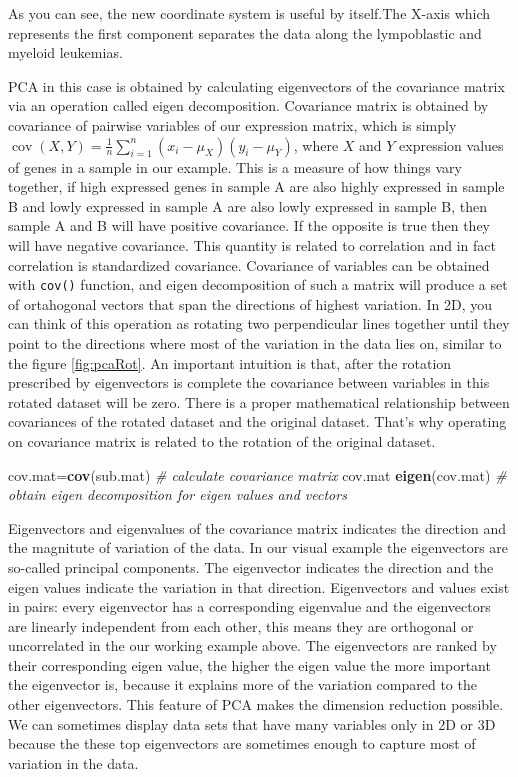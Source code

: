 \documentclass[12pt,]{krantz}
\newenvironment{Shaded}{\begin{snugshade}}{\end{snugshade}}
\newcommand{\CommentTok}[1]{\textcolor[rgb]{0.56,0.35,0.01}{\textit{#1}}}
\newcommand{\KeywordTok}[1]{\textcolor[rgb]{0.13,0.29,0.53}{\textbf{#1}}}
\newcommand{\NormalTok}[1]{#1}
\theoremstyle{definition}
\theoremstyle{definition}
\theoremstyle{definition}
\theoremstyle{remark}
\begin{document}
As you can see, the new coordinate system is useful by itself.The X-axis
which represents the first component separates the data along the
lympoblastic and myeloid leukemias.

PCA in this case is obtained by calculating eigenvectors of the
covariance matrix via an operation called eigen decomposition.
Covariance matrix is obtained by covariance of pairwise variables of our
expression matrix, which is simply
\({ \operatorname{cov} (X,Y)={\frac {1}{n}}\sum _{i=1}^{n}(x_{i}-\mu_X)(y_{i}-\mu_Y)}\),
where \(X\) and \(Y\) expression values of genes in a sample in our
example. This is a measure of how things vary together, if high
expressed genes in sample A are also highly expressed in sample B and
lowly expressed in sample A are also lowly expressed in sample B, then
sample A and B will have positive covariance. If the opposite is true
then they will have negative covariance. This quantity is related to
correlation and in fact correlation is standardized covariance.
Covariance of variables can be obtained with \texttt{cov()} function,
and eigen decomposition of such a matrix will produce a set of
ortahogonal vectors that span the directions of highest variation. In
2D, you can think of this operation as rotating two perpendicular lines
together until they point to the directions where most of the variation
in the data lies on, similar to the figure \ref{fig:pcaRot}. An
important intuition is that, after the rotation prescribed by
eigenvectors is complete the covariance between variables in this
rotated dataset will be zero. There is a proper mathematical
relationship between covariances of the rotated dataset and the original
dataset. That's why operating on covariance matrix is related to the
rotation of the original dataset.

\begin{Shaded}
\begin{Highlighting}[]
\NormalTok{cov.mat=}\KeywordTok{cov}\NormalTok{(sub.mat) }\CommentTok{# calculate covariance matrix}
\NormalTok{cov.mat}
\KeywordTok{eigen}\NormalTok{(cov.mat) }\CommentTok{# obtain eigen decomposition for eigen values and vectors}
\end{Highlighting}
\end{Shaded}

Eigenvectors and eigenvalues of the covariance matrix indicates the
direction and the magnitute of variation of the data. In our visual
example the eigenvectors are so-called principal components. The
eigenvector indicates the direction and the eigen values indicate the
variation in that direction. Eigenvectors and values exist in pairs:
every eigenvector has a corresponding eigenvalue and the eigenvectors
are linearly independent from each other, this means they are orthogonal
or uncorrelated in the our working example above. The eigenvectors are
ranked by their corresponding eigen value, the higher the eigen value
the more important the eigenvector is, because it explains more of the
variation compared to the other eigenvectors. This feature of PCA makes
the dimension reduction possible. We can sometimes display data sets
that have many variables only in 2D or 3D because the these top
eigenvectors are sometimes enough to capture most of variation in the
data.
\end{document}
